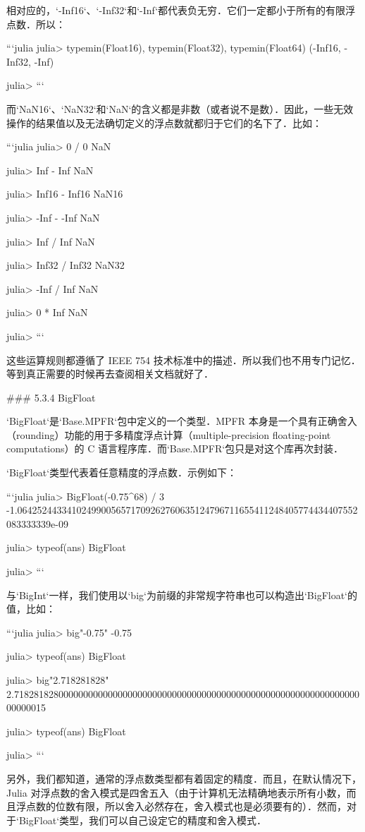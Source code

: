相对应的，`-Inf16`、`-Inf32`和`-Inf`都代表负无穷．它们一定都小于所有的有限浮点数．所以：

```julia
julia> typemin(Float16), typemin(Float32), typemin(Float64)
(-Inf16, -Inf32, -Inf)

julia> 
```

而`NaN16`、`NaN32`和`NaN`的含义都是非数（或者说不是数）．因此，一些无效操作的结果值以及无法确切定义的浮点数就都归于它们的名下了．比如：

```julia
julia> 0 / 0
NaN

julia> Inf - Inf
NaN

julia> Inf16 - Inf16
NaN16

julia> -Inf - -Inf
NaN

julia> Inf / Inf
NaN

julia> Inf32 / Inf32
NaN32

julia> -Inf / Inf
NaN

julia> 0 * Inf
NaN

julia> 
```

这些运算规则都遵循了 IEEE 754 技术标准中的描述．所以我们也不用专门记忆．等到真正需要的时候再去查阅相关文档就好了．

### 5.3.4 BigFloat

`BigFloat`是`Base.MPFR`包中定义的一个类型．MPFR 本身是一个具有正确舍入（rounding）功能的用于多精度浮点计算（multiple-precision floating-point computations）的 C 语言程序库．而`Base.MPFR`包只是对这个库再次封装．

`BigFloat`类型代表着任意精度的浮点数．示例如下：

```julia
julia> BigFloat(-0.75^68) / 3
-1.064252443341024990056571709262760635124796711655411248405774434407552083333339e-09

julia> typeof(ans)
BigFloat

julia> 
```

与`BigInt`一样，我们使用以`big`为前缀的非常规字符串也可以构造出`BigFloat`的值，比如：

```julia
julia> big"-0.75"
-0.75

julia> typeof(ans)
BigFloat

julia> big"2.718281828"
2.718281828000000000000000000000000000000000000000000000000000000000000000000015

julia> typeof(ans)
BigFloat

julia> 
```

另外，我们都知道，通常的浮点数类型都有着固定的精度．而且，在默认情况下，Julia 对浮点数的舍入模式是四舍五入（由于计算机无法精确地表示所有小数，而且浮点数的位数有限，所以舍入必然存在，舍入模式也是必须要有的）．然而，对于`BigFloat`类型，我们可以自己设定它的精度和舍入模式．

